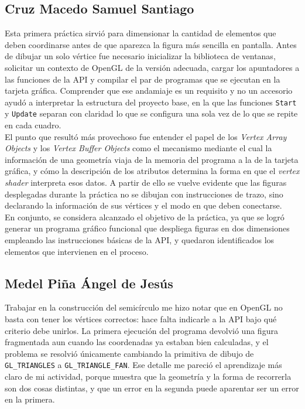    \subsection{Cruz Macedo Samuel Santiago}

    Esta primera práctica sirvió para dimensionar la cantidad de elementos que deben coordinarse antes de que aparezca la figura más sencilla en pantalla. Antes de dibujar un solo vértice fue necesario inicializar la biblioteca de ventanas, solicitar un contexto de OpenGL de la versión adecuada, cargar los apuntadores a las funciones de la API y compilar el par de programas que se ejecutan en la tarjeta gráfica. Comprender que ese andamiaje es un requisito y no un accesorio ayudó a interpretar la estructura del proyecto base, en la que las funciones \texttt{Start} y \texttt{Update} separan con claridad lo que se configura una sola vez de lo que se repite en cada cuadro.\\

    El punto que resultó más provechoso fue entender el papel de los \textit{Vertex Array Objects} y los \textit{Vertex Buffer Objects} como el mecanismo mediante el cual la información de una geometría viaja de la memoria del programa a la de la tarjeta gráfica, y cómo la descripción de los atributos determina la forma en que el \textit{vertex shader} interpreta esos datos. A partir de ello se vuelve evidente que las figuras desplegadas durante la práctica no se dibujan con instrucciones de trazo, sino declarando la información de sus vértices y el modo en que deben conectarse.\\

    En conjunto, se considera alcanzado el objetivo de la práctica, ya que se logró generar un programa gráfico funcional que despliega figuras en dos dimensiones empleando las instrucciones básicas de la API, y quedaron identificados los elementos que intervienen en el proceso.\\

        \subsection{Medel Piña Ángel de Jesús}

    Trabajar en la construcción del semicírculo me hizo notar que en OpenGL no basta con tener los vértices correctos: hace falta indicarle a la API bajo qué criterio debe unirlos. La primera ejecución del programa devolvió una figura fragmentada aun cuando las coordenadas ya estaban bien calculadas, y el problema se resolvió únicamente cambiando la primitiva de dibujo de \texttt{GL\_TRIANGLES} a \texttt{GL\_TRIANGLE\_FAN}. Ese detalle me pareció el aprendizaje más claro de mi actividad, porque muestra que la geometría y la forma de recorrerla son dos cosas distintas, y que un error en la segunda puede aparentar ser un error en la primera.\\


